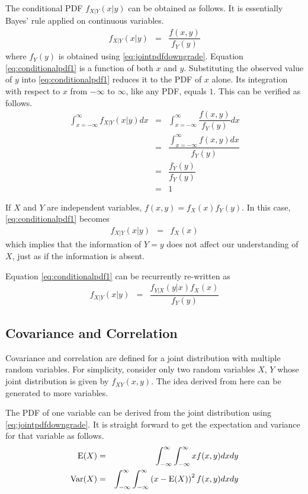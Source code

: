 The conditional PDF $f_{X|Y}(x|y)$ can be obtained as follows. It is essentially Bayes' rule applied on continuous variables.
\begin{eqnarray}
  f_{X|Y}(x|y) &=& \dfrac{f(x, y)}{f_Y(y)} \label{eq:conditionalpdf1}
\end{eqnarray}
where $f_Y(y)$ is obtained using \eqref{eq:jointpdfdowngrade}. Equation \eqref{eq:conditionalpdf1} is a function of both $x$ and $y$. Substituting the observed value of $y$ into \eqref{eq:conditionalpdf1} reduces it to the PDF of $x$ alone. Its integration with respect to $x$ from $-\infty$ to $\infty$, like any PDF, equals $1$. This can be verified as follows.
\begin{eqnarray}
  \int_{x=-\infty}^{\infty}f_{X|Y}(x|y)dx &=& \int_{x=-\infty}^{\infty}\dfrac{f(x, y)}{f_Y(y)}dx \nonumber \\
  &=& \dfrac{\int_{x=-\infty}^{\infty}f(x, y)dx}{f_Y(y)} \nonumber \\
  &=& \dfrac{f_Y(y)}{f_Y(y)} \nonumber \\
  &=& 1 \nonumber
\end{eqnarray}

If $X$ and $Y$ are independent variables, $f(x,y) = f_X(x)f_Y(y)$. In this case, \eqref{eq:conditionalpdf1} becomes
\begin{eqnarray}
  f_{X|Y}(x|y) &=& f_X(x) \nonumber
\end{eqnarray}
which implies that the information of $Y=y$ does not affect our understanding of $X$, just as if the information is absent.

Equation \eqref{eq:conditionalpdf1} can be recurrently re-written as
\begin{eqnarray}
f_{X|Y}(x|y) &=& \dfrac{f_{Y|X}(y|x)f_X(x)}{f_Y(y)} \label{eq:conditionalpdf1a}
\end{eqnarray}


\subsection{Covariance and Correlation}

Covariance and correlation are defined for a joint distribution with multiple random variables. For simplicity, consider only two random variables $X$, $Y$ whose joint distribution is given by $f_{XY}(x, y)$. The idea derived from here can be generated to more variables.

The PDF of one variable can be derived from the joint distribution using \eqref{eq:jointpdfdowngrade}. It is straight forward to get the expectation and variance for that variable as follows.
\begin{eqnarray}
	\textup{E}(X) &=& \int_{-\infty}^{\infty}\int_{-\infty}^{\infty}xf(x, y)dxdy \nonumber \\
	\textup{Var}(X) &=& \int_{-\infty}^{\infty}\int_{-\infty}^{\infty}\left(x-\textup{E}(X)\right)^2f(x, y)dxdy \nonumber
\end{eqnarray}

